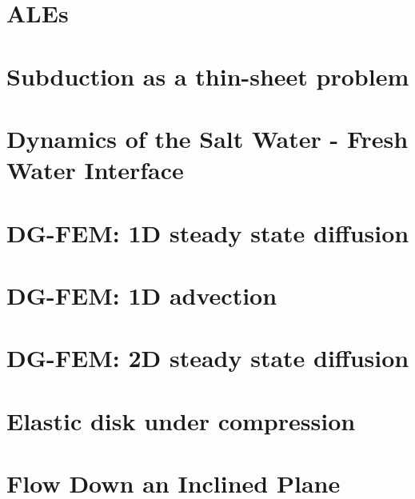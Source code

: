 \documentclass[a4paper,11pt]{report}
\begin{document}
\chapter{ALEs  \label{f54}} 

\chapter{Subduction as a thin-sheet problem  \label{f55}} 

\chapter{Dynamics of the Salt Water - Fresh Water Interface \label{f56}} 

\chapter{DG-FEM: 1D steady state diffusion \label{f57}} 

\chapter{DG-FEM: 1D advection \label{f60}} 

\chapter{DG-FEM: 2D steady state diffusion \label{f79}}

\chapter{Elastic disk under compression \label{f58}} 

\chapter{Flow Down an Inclined Plane \label{f59}} 
\end{document}
